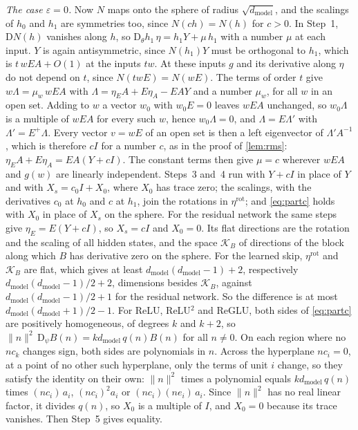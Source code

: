 \documentclass[10pt]{article}
\theoremstyle{definition}
\theoremstyle{remark}
\newcommand{\dm}{d_{\mathrm{model}}}
\newcommand{\Der}{\mathrm{D}}
\newcommand{\norm}[1]{\lVert #1\rVert}
\begin{document}
\emph{The case $\varepsilon = 0$.} Now $N$ maps onto the sphere of radius $\sqrt{\dm}$, and the scalings of $h_0$ and $h_1$ are symmetries too, since $N(ch) = N(h)$ for $c > 0$. In Step~1, $\Der N(h)$ vanishes along $h$, so $\Der_\theta h_1\,\eta = h_1Y + \mu\,h_1$ with a number $\mu$ at each input. $Y$ is again antisymmetric, since $N(h_1)Y$ must be orthogonal to $h_1$, which is $t\,wEA + O(1)$ at the inputs $tw$. At these inputs $g$ and its derivative along $\eta$ do not depend on $t$, since $N(twE) = N(wE)$. The terms of order $t$ give $w\Lambda = \mu_w\,wEA$ with $\Lambda = \eta_EA + E\eta_A - EAY$ and a number $\mu_w$, for all $w$ in an open set. Adding to $w$ a vector $w_0$ with $w_0E = 0$ leaves $wEA$ unchanged, so $w_0\Lambda$ is a multiple of $wEA$ for every such $w$, hence $w_0\Lambda = 0$, and $\Lambda = E\Lambda'$ with $\Lambda' = E^+\Lambda$. Every vector $v = wE$ of an open set is then a left eigenvector of $\Lambda'A^{-1}$, which is therefore $cI$ for a number $c$, as in the proof of \cref{lem:rms}: $\eta_EA + E\eta_A = EA(Y + cI)$. The constant terms then give $\mu = c$ wherever $wEA$ and $g(w)$ are linearly independent. Steps~3 and~4 run with $Y + cI$ in place of $Y$ and with $X_s = c_0I + X_0$, where $X_0$ has trace zero; the scalings, with the derivatives $c_0$ at $h_0$ and $c$ at $h_1$, join the rotations in $\eta^{\mathrm{rot}}$; and \cref{eq:partc} holds with $X_0$ in place of $X_s$ on the sphere. For the residual network the same steps give $\eta_E = E(Y + cI)$, so $X_s = cI$ and $X_0 = 0$. Its flat directions are the rotation and the scaling of all hidden states, and the space $\mathcal K_B$ of directions of the block along which $B$ has derivative zero on the sphere. For the learned skip, $\eta^{\mathrm{rot}}$ and $\mathcal K_B$ are flat, which gives at least $\dm(\dm-1) + 2$, respectively $\dm(\dm-1)/2 + 2$, dimensions besides $\mathcal K_B$, against $\dm(\dm-1)/2 + 1$ for the residual network. So the difference is at most $\dm(\dm+1)/2 - 1$. For ReLU, ReLU$^2$ and ReGLU, both sides of \cref{eq:partc} are positively homogeneous, of degrees $k$ and $k + 2$, so $\norm{n}^2\,\Der_\psi B(n) = k\dm\,q(n)B(n)$ for all $n \neq 0$. On each region where no $nc_k$ changes sign, both sides are polynomials in $n$. Across the hyperplane $nc_i = 0$, at a point of no other such hyperplane, only the terms of unit $i$ change, so they satisfy the identity on their own: $\norm{n}^2$ times a polynomial equals $k\dm\,q(n)$ times $(nc_i)\,a_i$, $(nc_i)^2a_i$ or $(nc_i)(ne_i)\,a_i$. Since $\norm{n}^2$ has no real linear factor, it divides $q(n)$, so $X_0$ is a multiple of $I$, and $X_0 = 0$ because its trace vanishes. Then Step~5 gives equality.
\end{document}
